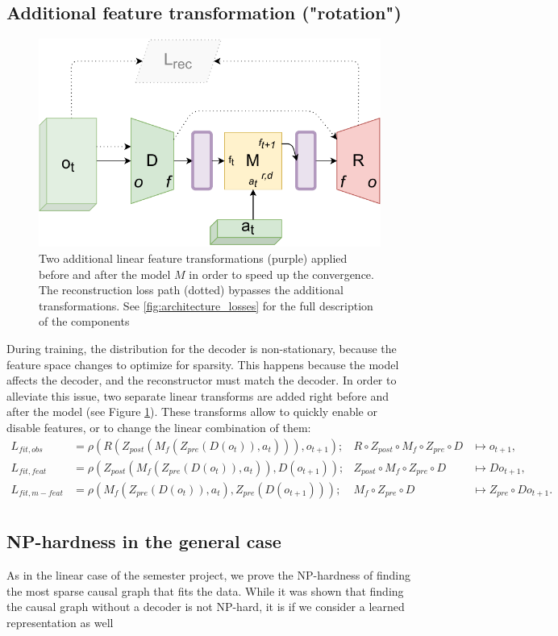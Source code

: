 \documentclass[a4paper,11pt,oneside]{report}
\begin{document}
\subsection{Additional feature transformation ("rotation")}
\begin{figure}[h]
    \centering
    \includegraphics[width=0.7\linewidth]{diagrams/architecture_rotation}
    \caption{Two additional linear feature transformations (purple) applied before and after the model $M$ in order to speed up the convergence. The reconstruction loss path (dotted) bypasses the additional transformations. See \autoref{fig:architecture_losses} for the full description of the components}
    \label{fig:architecture_rotation}
\end{figure}


During training, the distribution for the decoder is non-stationary, because the feature space changes to optimize for sparsity. This happens because the model affects the decoder, and the reconstructor must match the decoder. In order to alleviate this issue, two separate linear transforms are added right before and after the model (see Figure \ref{fig:architecture_rotation}). These transforms allow to quickly enable or disable features, or to change the linear combination of them:
$$
\begin{array}{clll}
L_{fit, obs}&=\rho(R(Z_{post}(M_f(Z_{pre}(D(o_t)),a_t))), o_{t+1});& R\circ Z_{post}\circ M_f \circ Z_{pre}\circ D&\mapsto o_{t+1},\\
L_{fit, feat}&=\rho(Z_{post}(M_f(Z_{pre}(D(o_t)),a_t)), D(o_{t+1}));&Z_{post}\circ M_f\circ Z_{pre}\circ D&\mapsto Do_{t+1},\\
L_{fit, m-feat}&=\rho(M_f(Z_{pre}(D(o_t)),a_t), Z_{pre}(D(o_{t+1})));&M_f\circ Z_{pre}\circ D&\mapsto Z_{pre}\circ Do_{t+1}.\\
\end{array}
$$

\subsection{NP-hardness in the general case}
As in the linear case of the semester project, we prove the NP-hardness of finding the most sparse causal graph that fits the data. While it was shown \cite{Claassen2013} that finding the causal graph without a decoder is not NP-hard, it is if we consider a learned representation as well
\end{document}

